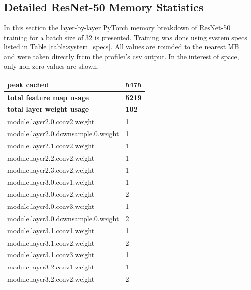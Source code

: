 \documentclass[12pt,letterpaper]{article}
\begin{document}
\newpage
\printbibliography

\newpage
\begin{appendices}


\section{Detailed ResNet-50 Memory Statistics}
\label{appendix:resnet_50_full_breakdown}
In this section the layer-by-layer PyTorch memory breakdown of ResNet-50 training for a batch size of 32 is presented. Training was done using system specs listed in Table \ref{table:system_specs}. All values are rounded to the nearest MB and were taken directly from the profiler's csv output. In the interest of space, only non-zero values are shown.
\begin{longtable}{@{}ll@{}}
\toprule
\textbf{peak cached}                              & \textbf{5475} \\ \midrule
\textbf{total feature map usage}                  & \textbf{5219} \\ \midrule
\textbf{total layer weight usage}                     & \textbf{102}  \\ \midrule
module.layer2.0.conv2.weight              & 1    \\ \midrule
module.layer2.0.downsample.0.weight       & 1    \\ \midrule
module.layer2.1.conv2.weight              & 1    \\ \midrule
module.layer2.2.conv2.weight              & 1    \\ \midrule
module.layer2.3.conv2.weight              & 1    \\ \midrule
module.layer3.0.conv1.weight              & 1    \\ \midrule
module.layer3.0.conv2.weight              & 2    \\ \midrule
module.layer3.0.conv3.weight              & 1    \\ \midrule
module.layer3.0.downsample.0.weight       & 2    \\ \midrule
module.layer3.1.conv1.weight              & 1    \\ \midrule
module.layer3.1.conv2.weight              & 2    \\ \midrule
module.layer3.1.conv3.weight              & 1    \\ \midrule
module.layer3.2.conv1.weight              & 1    \\ \midrule
module.layer3.2.conv2.weight              & 2    \\ \midrule

\end{longtable}
\end{appendices}
\end{document}
